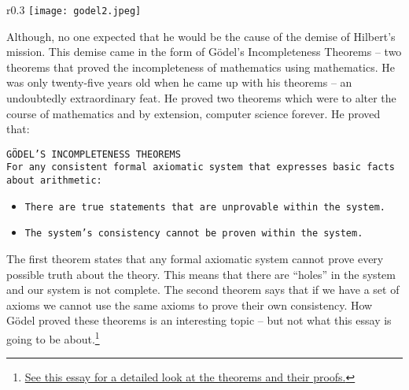 \documentclass[a4paper, 12pt]{article}
\newcommand{\godel}{G\"{o}del }
\newcommand{\godels}{G\"{o}del's }
\theoremstyle{definition}
\begin{document}
    \begin{wrapfigure}{r}{0.3\textwidth}
        \centering
        \vspace{-2 em}
        \texttt{[image: godel2.jpeg]}
        \caption[godel]{\textit{Kurt \godel}\footnotemark}
    \end{wrapfigure}
    Although, no one expected that he would be the cause of the demise of Hilbert's mission.
    This demise came in the form of \godels Incompleteness Theorems -- two theorems that proved the incompleteness 
    of mathematics using mathematics.\cite{raatikainen_2020}
    He was only twenty-five years old when he came up with his theorems -- an undoubtedly extraordinary feat.
    He proved two theorems which were to alter the course of mathematics and by extension, computer science forever. 
    He proved that: 
    \vspace{-0.5 em}
    \begin{center}
        \texttt{G\"{O}DEL'S INCOMPLETENESS THEOREMS} \\
        \texttt{For any consistent formal axiomatic system that expresses basic facts about arithmetic:
        } \vspace{-1 em}
        \begin{itemize}
            \item[\texttt{1.}] \texttt{There are true statements that are unprovable within the system.}
            \vspace{-0.3 em}
            \item[\texttt{2.}] \texttt{The system's consistency cannot be proven within the system.}  
        \end{itemize}
    \end{center}
    \vspace{-0.5 em}
    The first theorem states that any formal axiomatic system cannot prove every possible truth about the theory. This means that 
    there are ``holes'' in the system and our system is not complete. The second theorem says that if we have a set of axioms 
    we cannot use the same axioms to prove their own consistency. How G\"{o}del proved these theorems is an interesting topic -- but not 
    what this essay is going to be about.\footnote{\href{https://www.quantamagazine.org/how-godels-incompleteness-theorems-work-20200714/}
    {See this essay for a detailed look at the theorems and their proofs.}}
   \vspace{-1 em}
\end{document}
